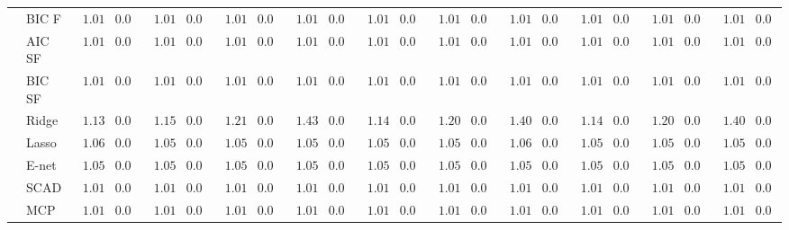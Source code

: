 \begin{tabular}{ll|ll|llllll|llllll|llllll}
	& BIC F  & $\phantom{0}1.01$ & $0.04$ & $\phantom{0}1.01$ & $0.04$ & $\phantom{0}1.01$ & $0.04$ & $\phantom{0}1.01$ & $0.04$ & $\phantom{0}1.01$ & $0.04$ & $\phantom{0}1.01$ & $0.04$ & $\phantom{0}1.01$ & $0.04$ & $\phantom{0}1.01$ & $0.04$ & $\phantom{0}1.01$ & $0.04$ & $\phantom{0}1.01$ & $0.04$ \\
	& AIC SF  & $\phantom{0}1.01$ & $0.04$ & $\phantom{0}1.01$ & $0.04$ & $\phantom{0}1.01$ & $0.04$ & $\phantom{0}1.01$ & $0.04$ & $\phantom{0}1.01$ & $0.04$ & $\phantom{0}1.01$ & $0.04$ & $\phantom{0}1.01$ & $0.04$ & $\phantom{0}1.01$ & $0.04$ & $\phantom{0}1.01$ & $0.04$ & $\phantom{0}1.01$ & $0.04$ \\
	& BIC SF  & $\phantom{0}1.01$ & $0.04$ & $\phantom{0}1.01$ & $0.04$ & $\phantom{0}1.01$ & $0.04$ & $\phantom{0}1.01$ & $0.04$ & $\phantom{0}1.01$ & $0.04$ & $\phantom{0}1.01$ & $0.04$ & $\phantom{0}1.01$ & $0.04$ & $\phantom{0}1.01$ & $0.04$ & $\phantom{0}1.01$ & $0.04$ & $\phantom{0}1.01$ & $0.04$ \\
	& Ridge  & $\phantom{0}1.13$ & $0.06$ & $\phantom{0}1.15$ & $0.06$ & $\phantom{0}1.21$ & $0.06$ & $\phantom{0}1.43$ & $0.07$ & $\phantom{0}1.14$ & $0.06$ & $\phantom{0}1.20$ & $0.07$ & $\phantom{0}1.40$ & $0.06$ & $\phantom{0}1.14$ & $0.06$ & $\phantom{0}1.20$ & $0.06$ & $\phantom{0}1.40$ & $0.08$ \\
	& Lasso  & $\phantom{0}1.06$ & $0.05$ & $\phantom{0}1.05$ & $0.05$ & $\phantom{0}1.05$ & $0.05$ & $\phantom{0}1.05$ & $0.05$ & $\phantom{0}1.05$ & $0.05$ & $\phantom{0}1.05$ & $0.05$ & $\phantom{0}1.06$ & $0.05$ & $\phantom{0}1.05$ & $0.05$ & $\phantom{0}1.05$ & $0.05$ & $\phantom{0}1.05$ & $0.05$ \\
	& E-net  & $\phantom{0}1.05$ & $0.05$ & $\phantom{0}1.05$ & $0.05$ & $\phantom{0}1.05$ & $0.05$ & $\phantom{0}1.05$ & $0.05$ & $\phantom{0}1.05$ & $0.05$ & $\phantom{0}1.05$ & $0.05$ & $\phantom{0}1.05$ & $0.05$ & $\phantom{0}1.05$ & $0.05$ & $\phantom{0}1.05$ & $0.05$ & $\phantom{0}1.05$ & $0.05$ \\
	& SCAD  & $\phantom{0}1.01$ & $0.04$ & $\phantom{0}1.01$ & $0.04$ & $\phantom{0}1.01$ & $0.04$ & $\phantom{0}1.01$ & $0.04$ & $\phantom{0}1.01$ & $0.04$ & $\phantom{0}1.01$ & $0.04$ & $\phantom{0}1.01$ & $0.04$ & $\phantom{0}1.01$ & $0.04$ & $\phantom{0}1.01$ & $0.04$ & $\phantom{0}1.01$ & $0.04$ \\
	& MCP  & $\phantom{0}1.01$ & $0.05$ & $\phantom{0}1.01$ & $0.04$ & $\phantom{0}1.01$ & $0.04$ & $\phantom{0}1.01$ & $0.05$ & $\phantom{0}1.01$ & $0.04$ & $\phantom{0}1.01$ & $0.04$ & $\phantom{0}1.01$ & $0.04$ & $\phantom{0}1.01$ & $0.04$ & $\phantom{0}1.01$ & $0.04$ & $\phantom{0}1.01$ & $0.05$ \\

\end{tabular}
